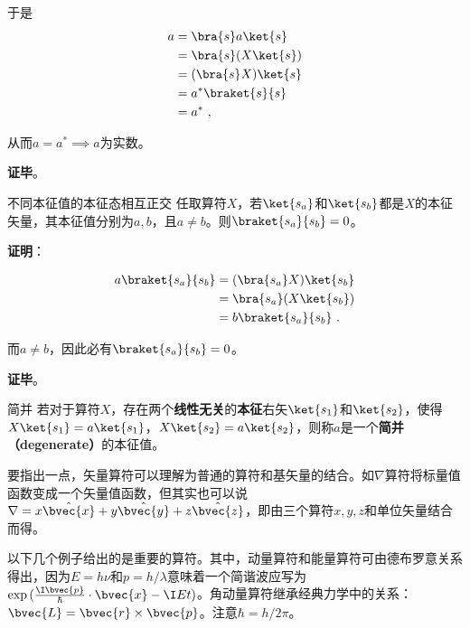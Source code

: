 于是
\begin{equation}\label{eq_QMPrcp_5}
\begin{aligned}
a&=\bra{s}a\ket{s}\\
&=\bra{s}(X\ket{s})\\
&=(\bra{s}X)\ket{s}\\
&=a^*\braket{s}{s}\\
&=a^*~,
\end{aligned}
\end{equation}

从而$a=a^*\implies a$为实数。

\textbf{证毕}。


\begin{theorem}{不同本征值的本征态相互正交}\label{the_QMPrcp_3}
任取算符$X$，若$\ket{s_a}$和$\ket{s_b}$都是$X$的本征矢量，其本征值分别为$a,b$，且$a\neq b$。则$\braket{s_a}{s_b}=0$。
\end{theorem}

\textbf{证明}：

\begin{equation}
\begin{aligned}
a\braket{s_a}{s_b}&=(\bra{s_a}X)\ket{s_b}\\
&=\bra{s_a}(X\ket{s_b})\\
&=b\braket{s_a}{s_b}~.
\end{aligned}
\end{equation}

而$a\neq b$，因此必有$\braket{s_a}{s_b}=0$。

\textbf{证毕}。



\begin{definition}{简并}\label{def_QMPrcp_16}
若对于算符$X$，存在两个\textbf{线性无关}的\textbf{本征}右矢$\ket{s_1}$和$\ket{s_2}$，使得$X\ket{s_1}=a\ket{s_1}$，$X\ket{s_2}=a\ket{s_2}$，则称$a$是一个\textbf{简并（degenerate）}的本征值。
\end{definition}






要指出一点，矢量算符可以理解为普通的算符和基矢量的结合。如$\nabla$算符将标量值函数变成一个矢量值函数，但其实也可以说$\nabla=x\hat{\bvec{x}}+y\hat{\bvec{y}}+z\hat{\bvec{z}}$，即由三个算符$x, y, z$和单位矢量结合而得。



以下几个例子给出的是重要的算符。其中，动量算符和能量算符可由德布罗意关系得出，因为$E=h\nu$和$p=h/\lambda$意味着一个简谐波应写为$\exp{(\frac{\I \bvec{p}}{\hbar}\cdot\bvec{x}-\I Et)}$。角动量算符继承经典力学中的关系：$\bvec{L}=\bvec{r}\times\bvec{p}$。注意$\hbar=h/2\pi$。

